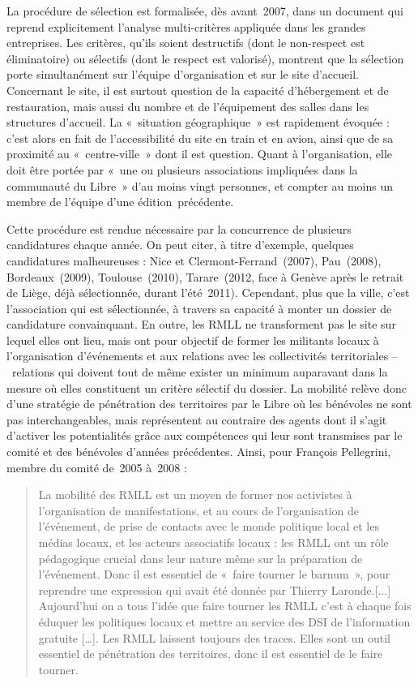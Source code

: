\documentclass{FramateX}
\begin{document}
\begin{refsection}
La procédure de sélection est formalisée, dès avant~2007, dans un
document qui reprend explicitement l'analyse multi-critères appliquée
dans les grandes entreprises. Les critères, qu'ils soient destructifs
(dont le non-respect est éliminatoire) ou sélectifs (dont le respect
est valorisé), montrent que la sélection porte simultanément sur
l'équipe d'organisation et sur le site d'accueil. Concernant le site,
il est surtout question de la capacité d'hébergement et de
restauration, mais aussi du nombre et de l'équipement des salles dans
les structures d'accueil. La «~situation
géographique~» est rapidement évoquée : c'est alors en fait de
l'accessibilité du site en train et en avion, ainsi que de sa proximité
au «~centre-ville~» dont il est question. Quant à
l'organisation, elle doit être portée par «~une ou
plusieurs associations impliquées dans la communauté du Libre~» d'au
moins vingt personnes, et compter au moins un membre de l'équipe d'une
édition~précédente.

Cette procédure est rendue nécessaire par la concurrence de plusieurs
candidatures chaque année. On peut citer, à titre d'exemple, quelques
candidatures malheureuses : Nice et Clermont-Ferrand~(2007),
Pau~(2008), Bordeaux~(2009), Toulouse~(2010), Tarare~(2012, face à
Genève après le retrait de Liège, déjà sélectionnée, durant
l'été~2011). Cependant, plus que la ville, c'est l'association qui est
sélectionnée, à travers sa capacité à monter un dossier de candidature
convainquant. En outre, les RMLL ne transforment pas le site sur lequel
elles ont lieu, mais ont pour objectif de former les militants locaux à
l'organisation d'événements et aux relations avec les collectivités
territoriales –~relations qui
doivent tout de même exister un minimum auparavant dans la mesure où
elles constituent un critère sélectif du dossier. La mobilité relève
donc d'une stratégie de pénétration des territoires par le Libre où les
bénévoles ne sont pas interchangeables, mais représentent au contraire
des agents dont il s'agit d'activer les potentialités grâce aux
compétences qui leur sont transmises par le comité et des bénévoles
d'années précédentes. Ainsi, pour François Pellegrini, membre du comité
de~2005 à~2008 :

\begin{quote}
La mobilité des RMLL est un moyen de former nos activistes à
l'organisation de manifestations, et au cours de l'organisation de
l'événement, de prise de contacts avec le monde politique local et les
médias locaux, et les acteurs associatifs locaux : les RMLL ont un rôle
pédagogique crucial dans leur nature même sur la préparation de
l'événement. Donc il est essentiel de «~faire tourner le barnum~», pour
reprendre une expression qui avait été donnée par Thierry Laronde.[...]
Aujourd'hui on a tous l'idée que faire tourner les RMLL c'est à chaque
fois éduquer les politiques locaux et mettre au service des DSI de
l'information gratuite [\ldots]. Les RMLL laissent toujours des traces.
Elles sont un outil essentiel de pénétration des territoires, donc il
est essentiel de le faire tourner.
\end{quote}


\end{refsection}
\end{document}
